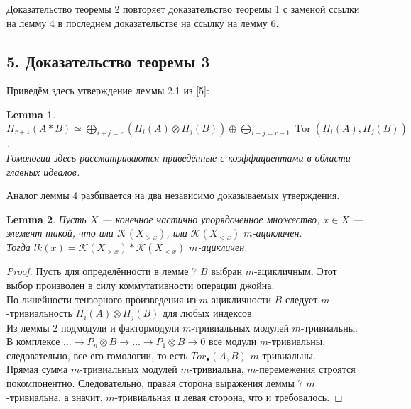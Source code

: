 \documentclass[a4paper, 12pt]{article}
\newtheorem{lemma}{Lemma}
\theoremstyle{definition}
\theoremstyle{remark}
\begin{document}
Доказательство теоремы 2 повторяет доказательство теоремы 1 с заменой ссылки на лемму 4 в последнем доказательстве на ссылку на лемму 6.

\subsection*{5. Доказательство теоремы 3}

Приведём здесь утверждение леммы 2.1 из [5]:\\
\begin{lemma}
  $H_{r+1}(A * B) \simeq \bigoplus_{i+j=r}(H_i(A) \otimes H_j(B)) \oplus \bigoplus_{i+j=r-1} \operatorname{Tor}(H_i(A),H_j(B))$.\\
  Гомологии здесь рассматриваются приведённые с коэффициентами в области главных идеалов.
\end{lemma}

Аналог леммы 4 разбивается на два независимо доказываемых утверждения.\\

\begin{lemma}
  Пусть $X$ --- конечное частично упорядоченное множество, $x \in X$ --- элемент такой, что или $\mathcal{K}(X_{>x})$, или $\mathcal{K}(X_{<x})$ $m$-ацикличен.\\
  Тогда $lk(x) = \mathcal{K}(X_{>x}) * \mathcal{K}(X_{<x})$ $m$-ацикличен.
\end{lemma}
\begin{proof}
  Пусть для определённости в лемме 7 $B$ выбран $m$-ацикличным. Этот выбор произволен в силу коммутативности операции джойна.\\
  По линейности тензорного произведения из $m$-ацикличности $B$ следует $m$-тривиальность $H_i(A) \otimes H_j(B)$ для любых индексов.\\
  Из леммы 2 подмодули и фактормодули $m$-тривиальных модулей $m$-тривиальны.\\
  В комплексе $\ldots \to P_n \otimes B \to \ldots \to P_1 \otimes B \to 0$ все модули $m$-тривиальны, следовательно, все его гомологии, то есть $Tor_{\bullet}(A,B)$ $m$-тривиальны.\\
  Прямая сумма $m$-тривиальных модулей $m$-тривиальна, $m$-перемежения строятся покомпонентно. Следовательно, правая сторона выражения леммы 7 $m$-тривиальна, а значит, $m$-тривиальная и левая сторона, что и требовалось.
\end{proof}
\end{document}
